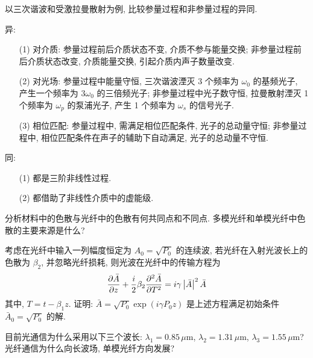 \documentclass{assignment}
\begin{document}
\begin{prob}
    以三次谐波和受激拉曼散射为例, 比较参量过程和非参量过程的异同.
\end{prob}
\begin{sol}
    异:
    \begin{itemize}
        \item[(1)] 对介质: 参量过程前后介质状态不变, 介质不参与能量交换; 非参量过程前后介质状态改变, 介质能量交换, 引起介质内声子数量改变.
        \item[(2)] 对光场: 参量过程中能量守恒, 三次谐波湮灭 3 个频率为 $\omega_0$ 的基频光子, 产生一个频率为 $3\omega_0$ 的三倍频光子; 非参量过程中光子数守恒, 拉曼散射湮灭 1 个频率为 $\omega_p$ 的泵浦光子, 产生 1 个频率为 $\omega_s$ 的信号光子.
        \item[(3)] 相位匹配: 参量过程中, 需满足相位匹配条件, 光子的总动量守恒; 非参量过程中, 相位匹配条件在声子的辅助下自动满足, 光子的总动量不守恒.
    \end{itemize}

    同:
    \begin{itemize}
        \item[(1)] 都是三阶非线性过程.
        \item[(2)] 都借助了非线性介质中的虚能级.
    \end{itemize}
\end{sol}

\begin{prob}
    分析材料中的色散与光纤中的色散有何共同点和不同点. 多模光纤和单模光纤中色散的主要来源是什么?
\end{prob}
\begin{sol}
    
\end{sol}

\begin{prob}
    考虑在光纤中输入一列幅度恒定为 $A_0=\sqrt{P_0}$ 的连续波, 若光纤在入射光波长上的色散为 $\beta_2$, 并忽略光纤损耗, 则光波在光纤中的传输方程为
    \[
        \frac{\partial\bar{A}}{\partial z}+\frac{i}{2}\beta_2\frac{\partial^2\bar{A}}{\partial T^2}=i\gamma\left\lvert\bar{A}\right\rvert^2\bar{A}
    \]
    其中, $T=t-\beta_1z$. 证明: $\bar{A}=\sqrt{P_0}\exp(i\gamma P_0z)$ 是上述方程满足初始条件 $\bar{A}_0=\sqrt{P_0}$ 的解.
\end{prob}
\begin{pf}
    
\end{pf}

\begin{prob}
    目前光通信为什么采用以下三个波长: $\lambda_1=0.85\,\mu$m, $\lambda_2=1.31\,\mu$m, $\lambda_3=1.55\,\mu$m? 光纤通信为什么向长波场, 单模光纤方向发展?
\end{prob}
\begin{sol}
    
\end{sol}
\end{document}
